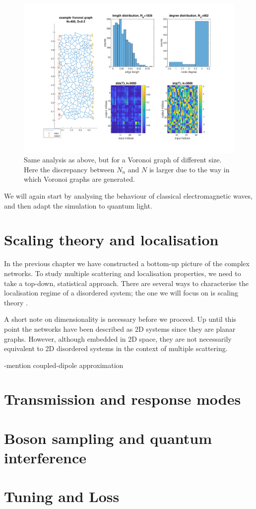 \begin{figure}[h]
  \centering
    \includegraphics[width=\textwidth]{ch3/fig3/example_v.pdf}
    \caption{Same analysis as above, but for a Voronoi graph of different size. Here the discrepancy between $N_n$ and $N$ is larger due to the way in which Voronoi graphs are generated.} 
    \label{fig:example_voronoi}
\end{figure}

We will again start by analysing the behaviour of classical electromagnetic waves, and then adapt the simulation to quantum light.

\section{Scaling theory and localisation}
In the previous chapter we have constructed a bottom-up picture of the complex networks. To study multiple scattering and localisation properties, we need to take a top-down, statistical approach. There are several ways to characterise the localisation regime of a disordered system; the one we will focus on is scaling theory \cite{Muller2011,Abrahams1979}.

A short note on dimensionality is necessary before we proceed. Up until this point the networks have been described as 2D systems since they are planar graphs. However, although embedded in 2D space, they are not necessarily equivalent to 2D disordered systems in the context of multiple scattering.  





-mention coupled-dipole approximation \cite{Yurkin2007}


\section{Transmission and response modes}

\section{Boson sampling and quantum interference}

\section{Tuning and Loss}